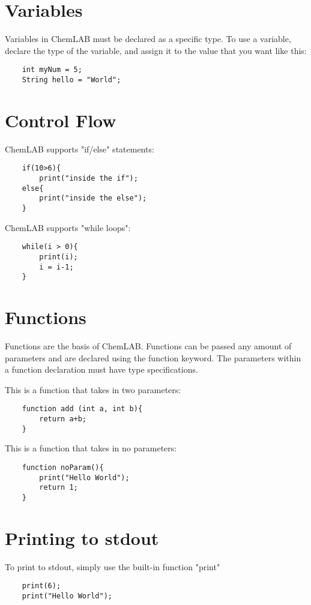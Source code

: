 \documentclass[11pt]{report}
\begin{document}
\section{Variables}
Variables in ChemLAB must be declared as a specific type. To use a variable, declare the type of the variable, and assign it to the value that you want like this:
	\begin{verbatim}
	int myNum = 5;
	String hello = "World"; 
	\end{verbatim}

\section{Control Flow}
ChemLAB supports "if/else" statements: 
	\begin{verbatim}
	if(10>6){
		print("inside the if");
	else{
		print("inside the else");
	}
	\end{verbatim}
	
ChemLAB supports "while loops": 
	\begin{verbatim}
	while(i > 0){
		print(i);
		i = i-1;
	}
	\end{verbatim}
	
\section{Functions}
Functions are the basis of ChemLAB. Functions can be passed any amount of parameters and are declared using the function keyword. The parameters within a function declaration must have type specifications. 

This is a function that takes in two parameters:
	\begin{verbatim}
	function add (int a, int b){
		return a+b;
	}
	\end{verbatim}
	
This is a function that takes in no parameters:
	\begin{verbatim}
	function noParam(){
		print("Hello World");
		return 1;
	}
	\end{verbatim}

\section{Printing to stdout}

To print to stdout, simply use the built-in function "print" 
\begin{verbatim}
	print(6);
	print("Hello World");
\end{verbatim}
\end{document}
